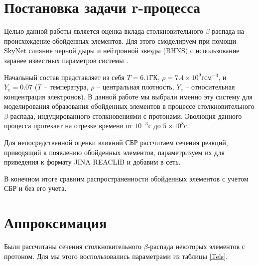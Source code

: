 \documentclass[14pt, a4paper]{article}
\begin{document}
\section{Постановка задачи r-процесса}

Целью данной работы является оценка вклада столкновительного $\beta$-распада на происхождение обойденных элементов. Для этого смоделируем при помощи SkyNet слияние черной дыры и нейтронной звезды (BHNS) с использование заранее известных параметров системы \cite{bhns}.

Начальный состав представляет из себя $T = 6.1 \text{ГК}$, $\rho = 7.4 \times 10^9 \text{г} \text{см}^{-3}$, и $Y_e = 0.07$ ($T$ -- температура, $\rho$ -- центральная плотность, $Y_e$ -- относительная концентрация электронов). В данной работе мы выбрали именно эту систему для моделирования образования обойденных элементов в процессе столкновительного $\beta$-распада, индуцированного столкновениями с протонами. Эволюция данного процесса протекает на отрезке времени от $10^{-3}\text{с}$ до $5\times10^8\text{с}$.

Для непосредственной оценки влияний СБР рассчитаем сечения реакций, приводящий к появлению обойденных элементов, параметризуем их для приведения к формату JINA REACLIB и добавим в сеть.

В конечном итоге сравним распространенности обойденных элементов с учетом СБР и без его учета.

\section{Аппроксимация}

Были рассчитаны сечения столкновительного $\beta$-распада некоторых элементов с протоном. Для мы этого воспользовались параметрами из таблицы \ref{Tels}. 
\end{document}
